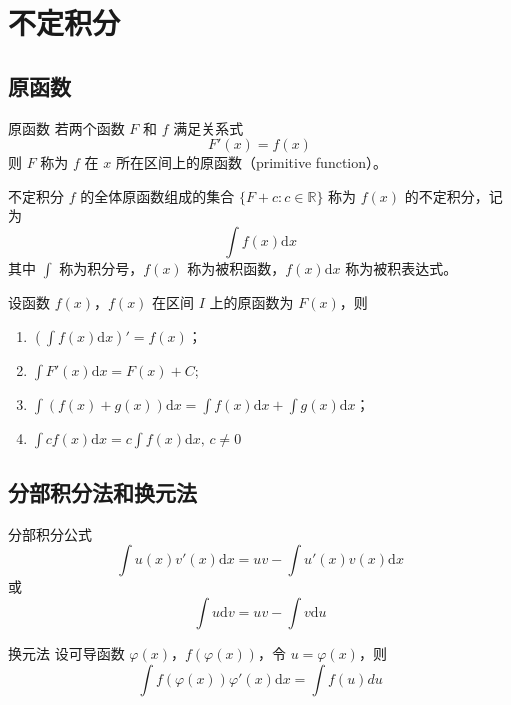 \chapter{不定积分}


\section{原函数}
\begin{definition}{原函数}
    若两个函数 $F$ 和 $f$ 满足关系式
    \[F'(x) = f(x)\]
    则 $F$ 称为 $f$ 在 $x$ 所在区间上的原函数（primitive function）。
\end{definition}

\begin{definition}{不定积分}
    $f$ 的全体原函数组成的集合 $\{F + c : c \in \mathbb{R}\}$ 称为 $f(x)$ 的不定积分，记为
    \[\int f(x)\mathrm{d}x\]
    其中 $\int$ 称为积分号，$f(x)$ 称为被积函数，$f(x)\mathrm{d}x$ 称为被积表达式。
\end{definition}


\begin{proposition}
    设函数 $f(x)$，$f(x)$ 在区间 $I$ 上的原函数为 $F(x)$，则
    \begin{enumerate}
        \item $\displaystyle \left(\int f(x)\mathrm{d}x\right)' = f(x)$；
        \item $\displaystyle \int F'(x)\mathrm{d}x = F(x) + C$;
        \item $\displaystyle \int (f(x) + g(x))\mathrm{d}x = \int f(x)\mathrm{d}x + \int g(x)\mathrm{d}x$；
        \item $\displaystyle \int cf(x)\mathrm{d}x = c\int f(x)\mathrm{d}x,\, c \ne 0$
    \end{enumerate}
\end{proposition}


\section{分部积分法和换元法}

\begin{proposition}{分部积分公式}
    \[\int u(x)v'(x)\mathrm{d}x = uv - \int u'(x)v(x)\mathrm{d}x\]
    或
    \[\int u\mathrm{d}v = uv - \int v\mathrm{d}u\]
\end{proposition}


\begin{proposition}{换元法}
    设可导函数 $\varphi(x)$，$f(\varphi(x))$，令 $u = \varphi(x)$，则
    \[\int f(\varphi(x))\varphi'(x)\mathrm{d}x = \int f(u)du\]
\end{proposition}


